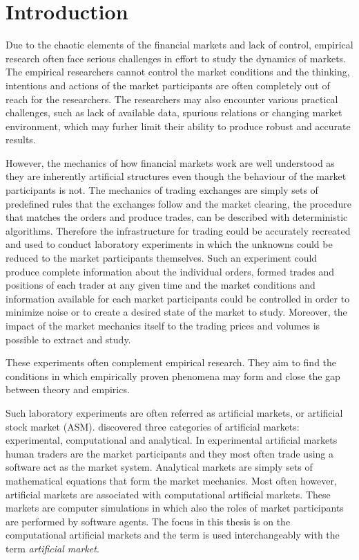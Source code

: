 \section{Introduction}

Due to the chaotic elements of the financial markets and lack of control, 
empirical research often face serious challenges in effort to study the 
dynamics of markets. The empirical researchers cannot control the market conditions 
and the thinking, intentions and actions of the market participants are often completely out of reach
for the researchers. The researchers may also encounter various practical challenges, such as 
lack of available data, spurious relations or changing market environment, 
which may furher limit their ability to produce robust and accurate results. 

However, the mechanics of how financial markets work are well 
understood as they are inherently artificial structures 
even though the behaviour of the market participants is not. 
The mechanics of trading exchanges are simply sets of predefined rules 
that the exchanges follow and the market clearing, the procedure 
that matches the orders and produce trades, can be described with 
deterministic algorithms. Therefore the infrastructure for trading
could be accurately recreated and used to conduct laboratory 
experiments in which the unknowns could be reduced to the market participants
themselves. Such an experiment could produce complete information about
the individual orders, formed trades and positions of each trader at any given time
and the market conditions and information available for each market participants could
be controlled in order to minimize noise or to create a desired state of the market to
study. Moreover, the impact of the market mechanics itself to the trading prices and volumes 
is possible to extract and study. 

These experiments often complement empirical research. They aim to find the
conditions in which empirically proven phenomena may form and close the gap
between theory and empirics. 

Such laboratory experiments are often referred as artificial markets, or artificial
stock market (ASM). \citet{Boer05} discovered three categories of artificial markets: 
experimental, computational and analytical. In experimental artificial markets human traders
are the market participants and they most often trade using a software act as
the market system. Analytical markets are simply sets of mathematical equations that
form the market mechanics. Most often however, artificial markets are associated with 
computational artificial markets. These markets are computer simulations in which 
also the roles of market participants are performed by software agents. The focus in this
thesis is on the computational artificial markets and the term is used interchangeably
with the term \textit{artificial market}. 

